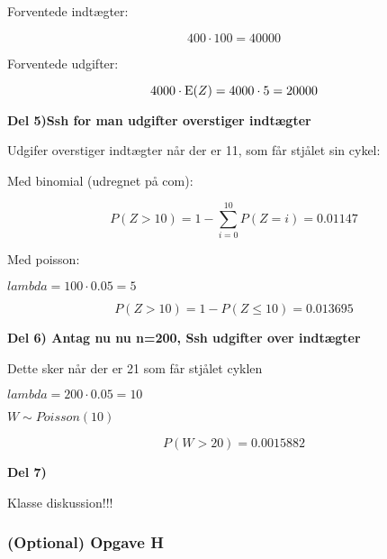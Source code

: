 Forventede indtægter:

\begin{equation}
    400 \cdot 100 = 40000
\end{equation}

Forventede udgifter:

\begin{equation}
    4000 \cdot \text{E}(Z) = 4000 \cdot 5 = 20000
\end{equation}

\textbf{Del 5)Ssh for man udgifter overstiger indtægter}

Udgifer overstiger indtægter når der er 11, som får stjålet sin cykel:

Med binomial (udregnet på com):

\begin{equation}
    P(Z > 10) = 1 - \sum_{i=0}^{10}P(Z=i) = 0.01147
\end{equation}

Med poisson:

$lambda = 100 \cdot 0.05 = 5$

\begin{equation}
    P(Z > 10) = 1 - P(Z\leq 10) = 0.013695
\end{equation}

\textbf{Del 6) Antag nu nu n=200, Ssh udgifter over indtægter}

Dette sker når der er 21 som får stjålet cyklen

$lambda = 200 \cdot 0.05 = 10$

$W \sim Poisson(10)$

\begin{equation}
    P(W>20) = 0.0015882
\end{equation}

\textbf{Del 7)}

Klasse diskussion!!!

\subsubsection{(Optional) Opgave H}

